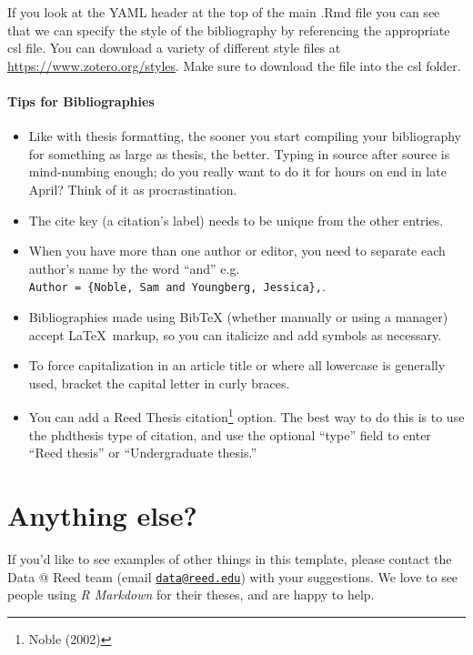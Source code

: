 \documentclass[12pt,twoside]{reedthesis}
\providecommand{\tightlist}{%
  \setlength{\itemsep}{0pt}\setlength{\parskip}{0pt}}
\begin{document}
  If you look at the YAML header at the top of the main .Rmd file you can
  see that we can specify the style of the bibliography by referencing the
  appropriate csl file. You can download a variety of different style
  files at \url{https://www.zotero.org/styles}. Make sure to download the
  file into the csl folder.
  
  \paragraph{Tips for Bibliographies}\label{tips-for-bibliographies-2}
  
  \begin{itemize}
  \tightlist
  \item
    Like with thesis formatting, the sooner you start compiling your
    bibliography for something as large as thesis, the better. Typing in
    source after source is mind-numbing enough; do you really want to do
    it for hours on end in late April? Think of it as procrastination.
  \item
    The cite key (a citation's label) needs to be unique from the other
    entries.
  \item
    When you have more than one author or editor, you need to separate
    each author's name by the word ``and'' e.g.
    \texttt{Author\ =\ \{Noble,\ Sam\ and\ Youngberg,\ Jessica\},}.
  \item
    Bibliographies made using BibTeX (whether manually or using a manager)
    accept \LaTeX~markup, so you can italicize and add symbols as
    necessary.
  \item
    To force capitalization in an article title or where all lowercase is
    generally used, bracket the capital letter in curly braces.
  \item
    You can add a Reed Thesis citation\footnote{Noble (2002)} option. The
    best way to do this is to use the phdthesis type of citation, and use
    the optional ``type'' field to enter ``Reed thesis'' or
    ``Undergraduate thesis.''
  \end{itemize}
  
  \section{Anything else?}\label{anything-else-2}
  
  If you'd like to see examples of other things in this template, please
  contact the Data @ Reed team (email
  \href{mailto:data@reed.edu}{\nolinkurl{data@reed.edu}}) with your
  suggestions. We love to see people using \emph{R Markdown} for their
  theses, and are happy to help.
  
\end{document}
